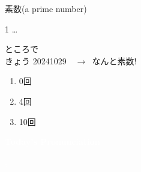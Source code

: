 \documentclass[aspectratio=169,xcolor={dvipsnames,table}]{beamer}
\begin{document}
\begin{frame}[plain]{素数(a prime number)}
\Large

\pause

1\hspace{10pt}\pause
{}\hspace{10pt}\pause
{}\hspace{10pt}\hspace{10pt}\pause
{}\hspace{10pt}\hspace{10pt}\pause
{}\hspace{10pt}\hspace{10pt}\hspace{10pt}\hspace{10pt}\pause
{}\hspace{10pt}\hspace{10pt}\pause
{}\hspace{10pt}\hspace{10pt}\hspace{10pt}\hspace{10pt}\pause
{} \ldots\hspace{10pt}\pause

\bigskip

ところで\\
きょう\hspace{10pt}
20241029\,\,\,\,\pause
$\longrightarrow$\,\,\,なんと素数!\\\pause
\begin{enumerate}
 \item 0回
 \item 4回
 \item 10回
\end{enumerate}

\hyperlink{today}{}
\end{frame}
\normalsize
\begin{frame}
\centering
  \textcolor{white}{\Huge\bfseries Today's Pronunciation}\pause

 \vspace{30pt}

  \textcolor{white}{\Huge\bfseries {}, }
\end{frame}
\end{document}
